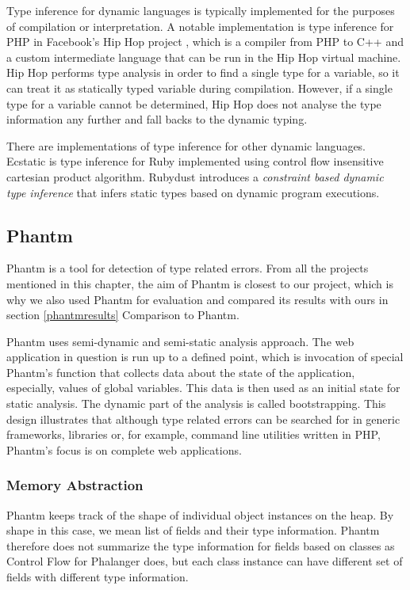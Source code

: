     Type inference for dynamic languages is typically implemented 
    for the purposes of compilation or interpretation. A notable implementation 
    is type inference for PHP in Facebook's Hip Hop project \cite{zhao2012hiphop}, 
    which is a compiler from PHP to C++ and a custom intermediate language 
    that can be run in the Hip Hop virtual machine. Hip Hop performs type 
    analysis in order to find a single type for a variable, so it can treat 
    it as statically typed variable during compilation. However, if a single 
    type for a variable cannot be determined, Hip Hop does not analyse 
    the type information any further and fall backs to the dynamic typing.    
        
    There are implementations of type inference for other dynamic languages. 
    Ecstatic\cite{madsen2007ecstatic} is type inference for Ruby 
    implemented using control flow insensitive cartesian product algorithm. 
    Rubydust\cite{an2011dynamic} introduces a \emph{constraint based dynamic 
    type inference} that infers static types based on dynamic program 
    executions.

    \subsection{Phantm}
    
    Phantm\cite{kneuss2010phantm} is a tool for detection of type related 
    errors. From all the projects mentioned in this chapter, the aim of 
    Phantm is closest to our project, which is why we also used Phantm 
    for evaluation and compared its results with ours in 
    section \ref{phantmresults} Comparison to Phantm.
    
    Phantm uses semi-dynamic and semi-static analysis approach. The web 
    application in question is run up to a defined point, which is invocation 
    of special Phantm's function that collects data about the state of the application, 
    especially, values of global variables. This data is then used as an initial 
    state for static analysis. The dynamic part of the analysis is called bootstrapping. 
    This design illustrates that although type related errors can be searched for 
    in generic frameworks, libraries or, for example, command line utilities 
    written in PHP, Phantm's focus is on complete web applications.
    
    \subsubsection*{Memory Abstraction}
    Phantm keeps track of the shape of individual object instances on the heap. 
    By shape in this case, we mean list of fields and their type information. 
    Phantm therefore does not summarize the type information for fields based 
    on classes as Control Flow for Phalanger does, but each class instance 
    can have different set of fields with different type information.
    
